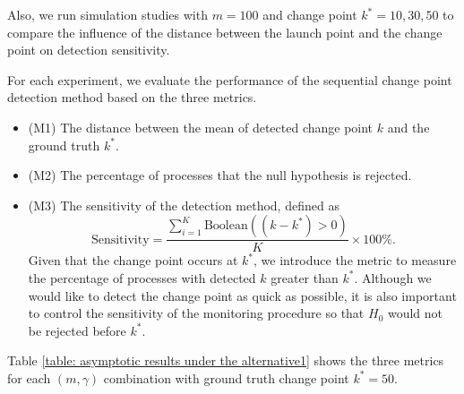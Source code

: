 \documentclass{article}
\theoremstyle{definition}
\begin{document}
Also, we run simulation studies with $m=100$ and change point $k^* = 10,30,50$ to compare the influence of the distance between the launch point and the change point on detection sensitivity. 

For each experiment, we evaluate the performance of the sequential change point detection method based on the three metrics.
\begin{itemize}
    \item (M1) The distance between the mean of detected change point $k$ and the ground truth $k^*$.
    \item (M2) The percentage of processes that the null hypothesis is rejected.
    \item (M3) The sensitivity of the detection method, defined as
    \begin{equation}
    \label{eq: definition of sensitivity}
        \text{Sensitivity} = \frac{\sum_{i=1}^K \text{Boolean}((k-k^*)>0)}{K} \times 100\%.
    \end{equation}
    Given that the change point occurs at $k^*$, we introduce the metric to measure the percentage of processes with detected $k$ greater than $k^*$. Although we would like to detect the change point as quick as possible, it is also important to control the sensitivity of the monitoring procedure so that
    $H_0$ would not be rejected before $k^*$.
\end{itemize}
Table \ref{table: asymptotic results under the alternative1} shows the three metrics for each $(m,\gamma)$ combination with ground truth change point $k^* = 50$. 
\end{document}
